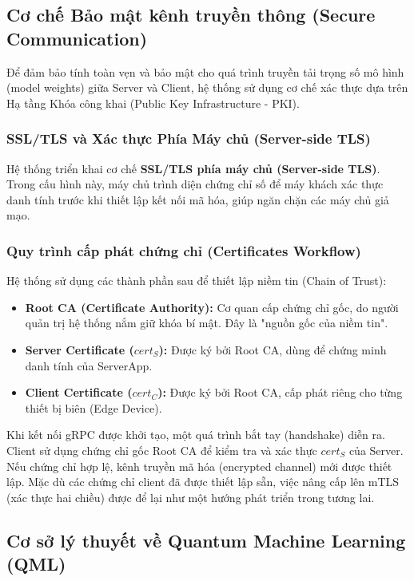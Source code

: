 \subsection{Cơ chế Bảo mật kênh truyền thông (Secure Communication)}

Để đảm bảo tính toàn vẹn và bảo mật cho quá trình truyền tải trọng số mô hình (model weights) giữa Server và Client, hệ thống sử dụng cơ chế xác thực dựa trên Hạ tầng Khóa công khai (Public Key Infrastructure - PKI).

\subsubsection{SSL/TLS và Xác thực Phía Máy chủ (Server-side TLS)}
Hệ thống triển khai cơ chế \textbf{SSL/TLS phía máy chủ (Server-side TLS)}. Trong cấu hình này, máy chủ trình diện chứng chỉ số để máy khách xác thực danh tính trước khi thiết lập kết nối mã hóa, giúp ngăn chặn các máy chủ giả mạo.

\subsubsection{Quy trình cấp phát chứng chỉ (Certificates Workflow)}
Hệ thống sử dụng các thành phần sau để thiết lập niềm tin (Chain of Trust):
\begin{itemize}
    \item \textbf{Root CA (Certificate Authority):} Cơ quan cấp chứng chỉ gốc, do người quản trị hệ thống nắm giữ khóa bí mật. Đây là "nguồn gốc của niềm tin".
    \item \textbf{Server Certificate ($cert_S$):} Được ký bởi Root CA, dùng để chứng minh danh tính của ServerApp.
    \item \textbf{Client Certificate ($cert_C$):} Được ký bởi Root CA, cấp phát riêng cho từng thiết bị biên (Edge Device).
\end{itemize}

Khi kết nối gRPC được khởi tạo, một quá trình bắt tay (handshake) diễn ra. Client sử dụng chứng chỉ gốc Root CA để kiểm tra và xác thực $cert_S$ của Server. Nếu chứng chỉ hợp lệ, kênh truyền mã hóa (encrypted channel) mới được thiết lập. Mặc dù các chứng chỉ client đã được thiết lập sẵn, việc nâng cấp lên mTLS (xác thực hai chiều) được để lại như một hướng phát triển trong tương lai.

\subsection{Cơ sở lý thuyết về Quantum Machine Learning (QML)}

